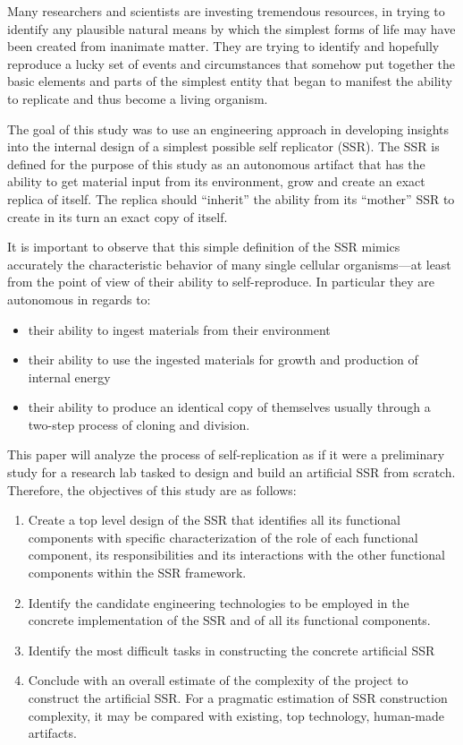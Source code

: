 Many researchers and scientists
are investing tremendous resources, in trying to identify any plausible
natural means by which the simplest forms of life may have been created
from inanimate matter. They are trying to identify and hopefully
reproduce a lucky set of events and circumstances that somehow put
together the basic elements and parts of the simplest entity that began
to manifest the ability to replicate and thus become a living organism.

The goal of this study was to use an engineering approach in developing
insights into the internal design of a simplest possible self
replicator (SSR). The SSR is defined for the purpose of this study as
an autonomous artifact that has the ability to get material input from
its environment, grow and create an exact replica of itself. The
replica should ``inherit'' the ability from its ``mother'' SSR to create in
its turn an exact copy of itself.

It is important to observe that this simple definition of the SSR mimics
accurately the characteristic behavior of many single cellular
organisms---at least from the point of view of their ability to
self-reproduce. In particular they are autonomous in regards to:

\begin{itemize}
\item their ability to ingest materials from their environment
\item their ability to use the ingested materials for growth and
production of internal energy
\item their ability to produce an identical copy of themselves usually
through a two-step process of cloning and division.
\end{itemize}

This paper will analyze the process of self-replication as if it were 
a preliminary study for a research lab tasked to design and build an
artificial SSR from scratch.  Therefore, the objectives of this study 
are as follows:

\begin{enumerate}
\item  Create a top level design of the SSR that identifies all its
functional components with specific characterization of the role of
each functional component, its responsibilities and its interactions
with the other functional components within the SSR framework.
\item  Identify the candidate engineering technologies to be employed in
the concrete implementation of the SSR and of all its functional
components.
\item  Identify the most difficult tasks in constructing the
concrete artificial SSR
\item  Conclude with an overall estimate of the complexity of the
project to construct the artificial SSR. For a pragmatic estimation of
SSR construction complexity, it may be compared with 
existing, top technology, human-made artifacts.
\end{enumerate}


